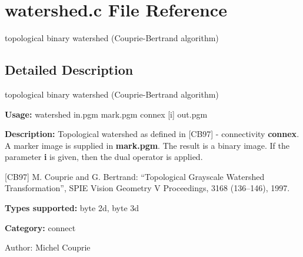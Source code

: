 \section{watershed.c File Reference}
\label{watershed_8c}
topological binary watershed (Couprie-Bertrand algorithm)  




\label{_details}
\subsection{Detailed Description}
topological binary watershed (Couprie-Bertrand algorithm) 

{\bf Usage:} watershed in.pgm mark.pgm connex [i] out.pgm

{\bf Description:} Topological watershed as defined in [CB97] - connectivity {\bf connex}. A marker image is supplied in {\bf mark.pgm}. The result is a binary image. If the parameter {\bf i} is given, then the dual operator is applied.

[CB97] M. Couprie and G. Bertrand: ``Topological Grayscale Watershed Transformation'', SPIE Vision Geometry V Proceedings, 3168 (136--146), 1997.

{\bf Types supported:} byte 2d, byte 3d

{\bf Category:} connect

\begin{Desc}
\item[Author:]Michel Couprie \end{Desc}
